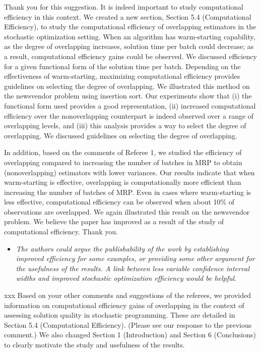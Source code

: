 \documentclass[11pt,notitlepage,onecolumn]{article}
\newcommand{\noi}{\noindent}
\begin{document}
\noi 
Thank you for this suggestion. 
It is indeed important to study computational efficiency in this context. 
We created a new section, Section 5.4 (Computational Efficiency), to study the computational efficiency of overlapping estimators in the stochastic optimization setting. 
When an algorithm has warm-starting capability, as the degree of overlapping increases,  solution time per batch could decrease; as a result, computational efficiency gains could be observed.  
We discussed efficiency for a given functional form of the solution time per batch. 
Depending on the effectiveness of warm-starting, maximizing computational efficiency provides guidelines on selecting the degree of overlapping. 
We illustrated this method on the newsvendor problem using insertion sort. 
Our experiments show that (i) the functional form used provides a good representation, (ii) increased computational efficiency over the nonoverlapping counterpart is indeed observed over a range of overlapping levels, and (iii) this analysis provides a way to select the degree of overlapping. 
We discussed guidelines on selecting the degree of overlapping. 
\medskip 

In addition, based on the comments of Referee 1, we studied the efficiency of overlapping compared to increasing the number of batches in MRP to obtain (nonoverlapping) estimators with lower variances. 
Our results indicate that when warm-starting is effective, overlapping is computationally more efficient than increasing the number of batches of MRP.
Even in cases where warm-starting is less effective, computational efficiency can be observed when about 10\% of observations are overlapped.
We again illustrated this result on the newsvendor problem. 
We believe the paper has improved as a result of the study of computational efficiency. 
Thank you. 
\medskip 


\begin{itemize}
\item[] \textit{The authors could argue the publishability of the work by establishing improved efficiency for some examples, or providing some other argument for the usefulness of the results.  
A link between less variable confidence interval widths and improved stochastic optimization efficiency would be helpful.}
\end{itemize}

\noi xxx 
Based on your other comments and suggestions of the referees, we provided information on computational efficiency gains of overlapping in the context of assessing solution quality in stochastic programming. 
These are detailed in Section 5.4 (Computational Efficiency). 
(Please see our response to the previous comment.)
We also changed Section 1 (Introduction) and Section 6 (Conclusions) to clearly motivate the study and usefulness of the results. 
\end{document}
